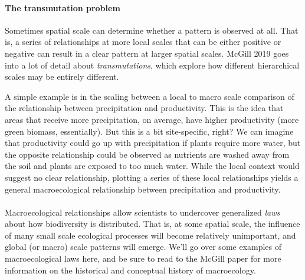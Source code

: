 \documentclass[12pt]{article}
\begin{document}
\paragraph*{The transmutation problem}

Sometimes spatial scale can determine whether a pattern is observed at all. That is, a series of relationships at more local scales that can be either positive or negative can result in a clear pattern at larger spatial scales. McGill 2019 goes into a lot of detail about \textit{transmutations}, which explore how different hierarchical scales may be entirely different. 


A simple example is in the scaling between a local to macro scale comparison of the relationship 
between precipitation and productivity. This is the idea that areas that receive more precipitation, on average, have higher productivity (more green biomass, essentially). But this is a bit site-specific, right? We can imagine that productivity could go up with precipitation if plants require more water, but the opposite relationship could be observed as nutrients are washed away from the soil and plants are exposed to too much water. While the local context would suggest no clear relationship, plotting a series of these local relationships yields a general macroecological relationship between precipitation and productivity. 










\paragraph*{}

Macroecological relationships allow scientists to undercover generalized \textit{laws} about how biodiversity is distributed. That is, at some spatial scale, the influence of many small scale ecological processes will become relatively unimportant, and global (or macro) scale patterns will emerge. We'll go over some examples of macroecological laws here, and be sure to read to the McGill paper for more information on the historical and conceptual history of macroecology.
 
\end{document}
